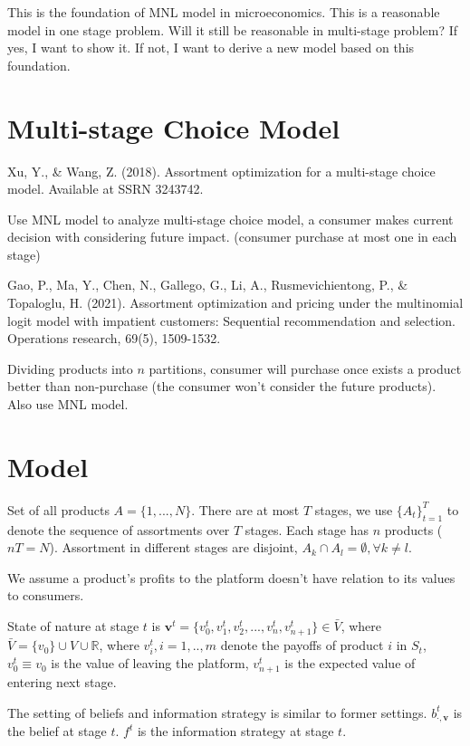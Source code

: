 \documentclass[11pt,a4paper]{article}
\begin{document}
This is the foundation of MNL model in microeconomics. This is a reasonable model in one stage problem. Will it still be reasonable in multi-stage problem? If yes, I want to show it. If not, I want to derive a new model based on this foundation.

\section{Multi-stage Choice Model}
Xu, Y., \& Wang, Z. (2018). Assortment optimization for a multi-stage choice model. Available at SSRN 3243742.

Use MNL model to analyze multi-stage choice model, a consumer makes current decision with considering future impact. (consumer purchase at most one in each stage)

Gao, P., Ma, Y., Chen, N., Gallego, G., Li, A., Rusmevichientong, P., \& Topaloglu, H. (2021). Assortment optimization and pricing under the multinomial logit model with impatient customers: Sequential recommendation and selection. Operations research, 69(5), 1509-1532.

Dividing products into $n$ partitions, consumer will purchase once exists a product better than non-purchase (the consumer won't consider the future products). Also use MNL model.









\section{Model}
Set of all products $A=\{1,...,N\}$. There are at most $T$ stages, we use $\{A_t\}_{t=1}^T$ to denote the sequence of assortments over $T$ stages. Each stage has $n$ products ($nT= N$). Assortment in different stages are disjoint, $A_k\cap A_l=\emptyset,\forall k\neq l$.

We assume a product's profits to the platform doesn't have relation to its values to consumers.

State of nature at stage $t$ is $\mathbf{v}^t=\{v^t_0,v_1^t,v_2^t,...,v_n^t,v_{n+1}^t\}\in \bar{V}$, where $\bar{V}=\{v_0\}\cup V\cup \mathbb{R}$, where $v_i^t,i=1,..,m$ denote the payoffs of product $i$ in $S_t$, $v^t_0\equiv v_0$ is the value of leaving the platform, $v_{n+1}^t$ is the expected value of entering next stage.

The setting of beliefs and information strategy is similar to former settings. $b^t_{\cdot,\mathbf{v}}$ is the belief at stage $t$. $f^t$ is the information strategy at stage $t$.
\end{document}

